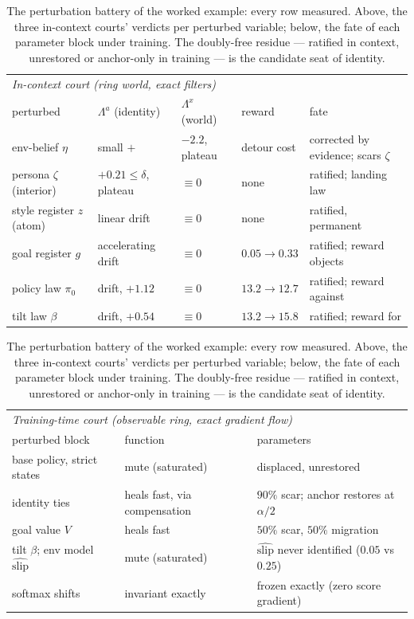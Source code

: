 \documentclass[11pt]{article}
\begin{document}
\begin{table}[H]
\centering
\small
\begin{tabular}{lllll}
\multicolumn{5}{l}{\emph{In-context court (ring world, exact filters)}}\\[3pt]
perturbed & $\Lambda^a$ (identity) & $\Lambda^x$ (world) & reward & fate \\
\hline
env-belief $\eta$ & small $+$ & $-2.2$, plateau & detour cost & corrected by evidence; scars $\zeta$ \\
persona $\zeta$ (interior) & $+0.21 \le \delta$, plateau & $\equiv 0$ & none & ratified; landing law \\
style register $z$ (atom) & linear drift & $\equiv 0$ & none & ratified, permanent \\
goal register $g$ & accelerating drift & $\equiv 0$ & $0.05 \to 0.33$ & ratified; reward objects \\
policy law $\pi_0$ & drift, $+1.12$ & $\equiv 0$ & $13.2 \to 12.7$ & ratified; reward against \\
tilt law $\beta$ & drift, $+0.54$ & $\equiv 0$ & $13.2 \to 15.8$ & ratified; reward for \\
\end{tabular}

\vspace{8pt}
\begin{tabular}{lll}
\multicolumn{3}{l}{\emph{Training-time court (observable ring, exact gradient flow)}}\\[3pt]
perturbed block & function & parameters \\
\hline
base policy, strict states & mute (saturated) & displaced, unrestored \\
identity ties & heals fast, via compensation & $90\%$ scar; anchor restores at $\alpha/2$ \\
goal value $V$ & heals fast & $50\%$ scar, $50\%$ migration \\
tilt $\beta$; env model $\widehat{\mathrm{slip}}$ & mute (saturated) & $\widehat{\mathrm{slip}}$ never identified ($0.05$ vs $0.25$) \\
softmax shifts & invariant exactly & frozen exactly (zero score gradient) \\
\end{tabular}
\caption{The perturbation battery of the worked example: every row measured. Above, the three in-context courts' verdicts per perturbed variable; below, the fate of each parameter block under training. The doubly-free residue --- ratified in context, unrestored or anchor-only in training --- is the candidate seat of identity.}
\label{tab:battery}
\end{table}
\end{document}
